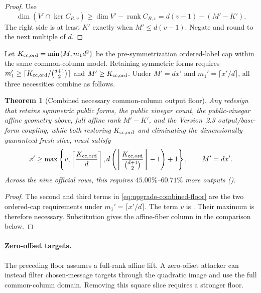 \documentclass[11pt]{article}
\newtheorem{theorem}{Theorem}[section]
\newcommand{\rank}{\operatorname{rank}}
\begin{document}
\begin{proof}
Use
\[
 \dim(V'\cap\ker C_{R,v})
 \ge\dim V'-\rank C_{R,v}
 =d(v-1)-(M'-K').
\]
The right side is at least $K'$ exactly when $M'\le d(v-1)$.  Negate and
round to the next multiple of $d$.
\end{proof}

Let $K_{\rm cc,ord}=\min\{M,m_1d^2\}$ be the pre-symmetrization ordered-label
cap within the same common-column model.  Retaining symmetric forms requires
$m_1'\ge\lceil K_{\rm cc,ord}/\binom{d+1}{2}\rceil$ and
$M'\ge K_{\rm cc,ord}$.  Under
$M'=dx'$ and $m_1'=\lceil x'/d\rceil$, all three necessities combine as
follows.

\begin{theorem}[Combined necessary common-column output floor]
\label{thm:upgrade-combined-floor}
Any redesign that retains symmetric public forms, the public vinegar count,
the public-vinegar affine geometry above, full affine rank $M'-K'$, and the
Version~2.3 output/base-form coupling, while both restoring
$K_{\rm cc,ord}$ and eliminating the dimensionally guaranteed fresh slice,
must satisfy
\begin{equation}
 x'\ge\max\left\{
 v,
  \left\lceil\frac{K_{\rm cc,ord}}d\right\rceil,
 d\left(
  \left\lceil\frac{K_{\rm cc,ord}}{\binom{d+1}{2}}\right\rceil-1
 \right)+1
 \right\},
 \qquad M'=dx'.                                      \label{eq:upgrade-combined-floor}
\end{equation}
Across the nine official rows, this requires $45.00\%$--$60.71\%$ more
outputs ().
\end{theorem}

\begin{proof}
The second and third terms in \eqref{eq:upgrade-combined-floor} are the two
ordered-cap requirements under $m_1'=\lceil x'/d\rceil$.  The term $v$ is
.  Their maximum is therefore necessary.
Substitution gives the affine-fiber column in the comparison below.
\end{proof}

\paragraph{Zero-offset targets.}
\label{sec:upgrade-zero-offset-repair}

The preceding floor assumes a full-rank affine lift.  A zero-offset attacker
can instead filter chosen-message targets through the quadratic image and use
the full common-column domain.  Removing this square slice requires a stronger
floor.
\end{document}
